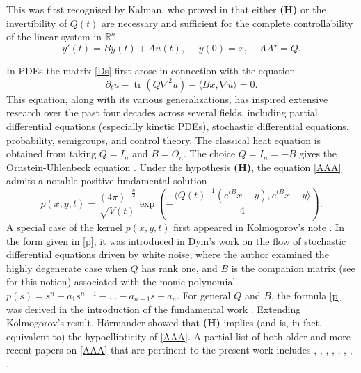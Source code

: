 \documentclass[11pt,letter]{amsart}
\newcommand{\Rn}{\mathbb R^n}
\newcommand{\p}{\partial}
\numberwithin{equation}{section}
\newcommand{\tr}{\operatorname{tr}}
\newcommand{\sa}{\langle}
\newcommand{\da}{\rangle}
\numberwithin{equation}{section}
\begin{document}
\noindent This was first recognised by Kalman, who  proved in \cite[Cor. 5.5]{Kal} that either \textbf{(H)} or the invertibility of $Q(t)$ are necessary and sufficient for the complete controllability of the linear system in $\Rn$
\[
y'(t) = B y(t) + A u(t),\ \ \ \ \ \ y(0) = x,\ \ \ \ \ A A^\star = Q.
\] 

\noindent  In PDEs the matrix \eqref{Ds} first arose in connection with the equation 
\begin{equation}\label{AAA}
\p_t u -  \tr(Q\nabla^2 u) -  \sa Bx,\nabla u\da   = 0.
\end{equation}
This equation, along with its various generalizations, has inspired extensive research over the past four decades across several fields, including partial differential equations (especially kinetic PDEs), stochastic differential equations, probability, semigroups, and control theory.
The classical heat equation is obtained from taking $Q = I_n$ and $B = O_n$. The choice $Q = I_n = - B$ gives the Ornstein-Uhlenbeck equation \cite{OU}. Under the hypothesis \textbf{(H)}, the equation \eqref{AAA} admits a notable positive fundamental solution 
\begin{equation}\label{p}
p(x,y,t) = \frac{(4\pi)^{-\frac n2}}{\sqrt{V(t)}} \exp\left( - \frac{\sa Q(t)^{-1}(e^{tB}x-y),e^{tB}x-y\da}{4}\right).
\end{equation}
A special case of the kernel $p(x,y,t)$ first appeared in Kolmogorov's note \cite{Kol}. In the form given in \eqref{p}, it was introduced in Dym's work \cite[p.134]{Dym} on the flow of stochastic differential equations driven by white noise, where the author examined the highly degenerate case when $Q$ has rank one, and $B$ is the companion matrix (see \cite[Sec.5.2]{Bernie} for this notion) associated with the monic polynomial $p(s) = s^n - a_1 s^{n-1}-...-a_{n-1} s - a_n$. 
For general $Q$ and $B$, the 
formula \eqref{p} was derived in the introduction of the fundamental work \cite[p.148]{Ho}. Extending Kolmogorov's result, H\"ormander showed that \textbf{(H)} implies (and is, in fact,  equivalent to) the hypoellipticity of \eqref{AAA}. A partial list of both older and more recent papers on \eqref{AAA} that are pertinent to the present work  includes \cite{OU}, \cite{Kol},  \cite{Bri}, \cite{Ho}, \cite{Ku, Ku2},  \cite{LP}, \cite{Fre}, \cite{GTma} \cite{BGT}.  




\end{document}
